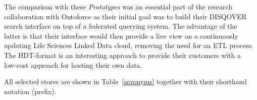 The comparison with these \emph{Prototypes} was an essential part of the research collaboration with Ontoforce as their initial goal was to build their DISQOVER search interface on top of a federated querying system. The advantage of the latter is that their interface would then provide a live view on a continuously updating Life Sciences Linked Data cloud, removing the need for an ETL process. The HDT-format is an interesting approach to provide their customers with a low-cost approach for hosting their own data.

All selected stores are shown in Table~\ref{acronyms} together with their shorthand notation (prefix).

\begin{table}[ht!]
	\centering
	\caption{List of the tested systems and their acronyms.}
	\label{acronyms}

\end{table}
